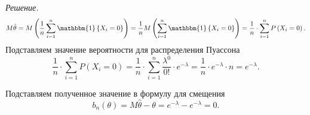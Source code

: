 \textit{Решение.}
$$M \hat{ \theta } =
  M \left( \frac{1}{n} \sum \limits_{i = 1}^n \mathbbm{1} \left\{ X_i = 0 \right\} \right) =
  \frac{1}{n} M \left( \sum \limits_{i = 1}^n \mathbbm{1} \left\{ X_i = 0 \right\} \right) =
  \frac{1}{n} \cdot \sum \limits_{i = 1}^n P \left( X_i = 0 \right).$$
Подставляем значение вероятности для распределения Пуассона
$$ \frac{1}{n} \cdot \sum \limits_{i = 1}^n P \left( X_i = 0 \right) =
  \frac{1}{n} \cdot \sum \limits_{i = 1}^n \frac{ \lambda^0}{0!} \cdot e^{- \lambda } =
  \frac{1}{n} \cdot e^{- \lambda } \cdot n =
  e^{- \lambda }.$$

Подставляем полученное значение в формулу для смещения
$$b_n \left( \theta \right) =
  M \hat{ \theta } - \theta =
  e^{- \lambda } - e^{- \lambda } =
  0.$$
